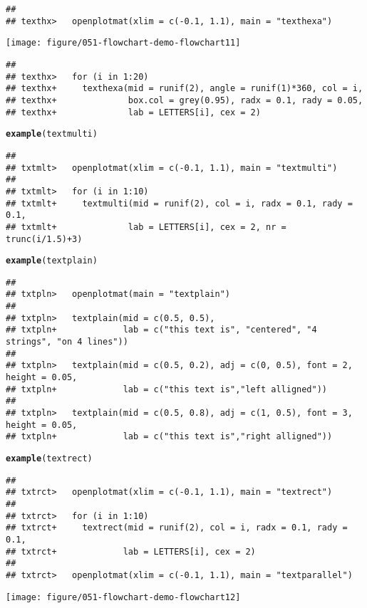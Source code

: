 \documentclass{article}\usepackage[]{graphicx}\usepackage[]{color}
\makeatletter
\def\maxwidth{ %
  \ifdim\Gin@nat@width>\linewidth
    \linewidth
  \else
    \Gin@nat@width
  \fi
}
\newcommand{\hlstd}[1]{\textcolor[rgb]{0.345,0.345,0.345}{#1}}%
\newcommand{\hlkwd}[1]{\textcolor[rgb]{0.737,0.353,0.396}{\textbf{#1}}}%
\newenvironment{kframe}{%
 \def\at@end@of@kframe{}%
 \ifinner\ifhmode%
  \def\at@end@of@kframe{\end{minipage}}%
  \begin{minipage}{\columnwidth}%
 \fi\fi%
 \def\FrameCommand##1{\hskip\@totalleftmargin \hskip-\fboxsep
 \colorbox{shadecolor}{##1}\hskip-\fboxsep
     \hskip-\linewidth \hskip-\@totalleftmargin \hskip\columnwidth}%
 \MakeFramed {\advance\hsize-\width
   \@totalleftmargin\z@ \linewidth\hsize
   \@setminipage}}%
 {\par\unskip\endMakeFramed%
 \at@end@of@kframe}
\newenvironment{knitrout}{}{} %
\makeatother
\begin{document}
\begin{knitrout}
\begin{kframe}
\begin{verbatim}
## 
## texthx>   openplotmat(xlim = c(-0.1, 1.1), main = "texthexa")
\end{verbatim}
\end{kframe}
\texttt{[image: figure/051-flowchart-demo-flowchart11]} 
\begin{kframe}\begin{verbatim}
## 
## texthx>   for (i in 1:20) 
## texthx+     texthexa(mid = runif(2), angle = runif(1)*360, col = i,
## texthx+              box.col = grey(0.95), radx = 0.1, rady = 0.05,
## texthx+              lab = LETTERS[i], cex = 2)
\end{verbatim}
\begin{alltt}
\hlkwd{example}\hlstd{(textmulti)}
\end{alltt}
\begin{verbatim}
## 
## txtmlt>   openplotmat(xlim = c(-0.1, 1.1), main = "textmulti")
## 
## txtmlt>   for (i in 1:10) 
## txtmlt+     textmulti(mid = runif(2), col = i, radx = 0.1, rady = 0.1,
## txtmlt+              lab = LETTERS[i], cex = 2, nr = trunc(i/1.5)+3)
\end{verbatim}
\begin{alltt}
\hlkwd{example}\hlstd{(textplain)}
\end{alltt}
\begin{verbatim}
## 
## txtpln>   openplotmat(main = "textplain")
## 
## txtpln>   textplain(mid = c(0.5, 0.5), 
## txtpln+             lab = c("this text is", "centered", "4 strings", "on 4 lines"))
## 
## txtpln>   textplain(mid = c(0.5, 0.2), adj = c(0, 0.5), font = 2, height = 0.05,
## txtpln+             lab = c("this text is","left alligned"))
## 
## txtpln>   textplain(mid = c(0.5, 0.8), adj = c(1, 0.5), font = 3, height = 0.05, 
## txtpln+             lab = c("this text is","right alligned"))
\end{verbatim}
\begin{alltt}
\hlkwd{example}\hlstd{(textrect)}
\end{alltt}
\begin{verbatim}
## 
## txtrct>   openplotmat(xlim = c(-0.1, 1.1), main = "textrect")
## 
## txtrct>   for (i in 1:10) 
## txtrct+     textrect(mid = runif(2), col = i, radx = 0.1, rady = 0.1,
## txtrct+             lab = LETTERS[i], cex = 2)
## 
## txtrct>   openplotmat(xlim = c(-0.1, 1.1), main = "textparallel")
\end{verbatim}
\end{kframe}
\texttt{[image: figure/051-flowchart-demo-flowchart12]} 

\end{knitrout}
\end{document}
